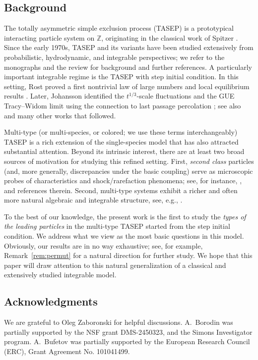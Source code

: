 \documentclass[11pt,reqno]{amsart}
\theoremstyle{definition}
\theoremstyle{remark}
\theoremstyle{remark}
\numberwithin{equation}{section}
\begin{document}
	\subsection{Background} 
	
	The totally asymmetric simple exclusion process (TASEP) is a prototypical interacting particle system on $\mathbb{Z}$, originating in the classical work of Spitzer \cite{Spi}. Since the early 1970s, TASEP and its variants have been studied extensively from probabilistic, hydrodynamic, and integrable perspectives; we refer to the monographs \cite{Lig,Lig2,KL,Spo} and the review \cite{Der} for background and further references. A particularly important integrable regime is the TASEP with step initial condition. In this setting, Rost proved a first nontrivial law of large numbers and local equilibrium results \cite{Ros}. Later, Johansson identified the $t^{1/3}$-scale fluctuations and the GUE Tracy--Widom limit using the connection to last passage percolation \cite{Joh}; see also \cite{PS,TW,Sch} and many other works that followed.
	
	Multi-type (or multi-species, or colored; we use these terms interchangeably) TASEP is a rich extension of the single-species model that has also attracted substantial attention. Beyond its intrinsic interest, there are at least two broad sources of motivation for studying this refined setting. First, \emph{second class} particles (and, more generally, discrepancies under the basic coupling) serve as microscopic probes of characteristics and shock/rarefaction phenomena; see, for instance, \cite{FK,MG,FP,BF}, and references therein. Second, multi-type systems exhibit a richer and often more natural algebraic and integrable structure, see, e.g., \cite{FM,AAV,Buf,BW-coloured,BW-observables,BB}.
	
	To the best of our knowledge, the present work is the first to study the \emph{types of the leading particles} in the multi-type TASEP started from the step initial condition. We address what we view as the most basic questions in this model. Obviously, our results are in no way exhaustive; see, for example, Remark~\ref{rem:permut} for a natural direction for further study. We hope that this paper will draw attention to this natural generalization of a classical and extensively studied integrable model.
	
	
	\subsection*{Acknowledgments}
	We are grateful to Oleg Zaboronski for helpful discussions. 
	A.~Borodin was partially supported by the NSF grant
	DMS-2450323, and the Simons Investigator program.
	A.~Bufetov was partially supported by the European Research Council (ERC), Grant Agreement No. 101041499.
	
\end{document}
